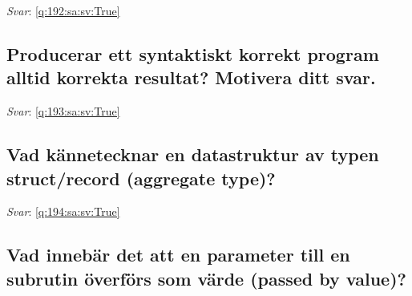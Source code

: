 \documentclass[a4paper,11pt,oneside]{article}
\begin{document}
\begin{sloppypar}
\label{q:192:sa:sv:False}

\vspace{2cm}

\noindent\makebox[\textwidth]{\hrulefill}

\vspace{1cm}

\textit{Svar}: \autoref{q:192:sa:sv:True}



\subsection{Producerar ett syntaktiskt korrekt program alltid korrekta resultat? Motivera ditt svar.}

\label{q:193:sa:sv:False}

\vspace{2cm}

\noindent\makebox[\textwidth]{\hrulefill}

\vspace{1cm}

\textit{Svar}: \autoref{q:193:sa:sv:True}



\subsection{Vad k\"annetecknar en datastruktur av typen struct/record (aggregate type)?}

\label{q:194:sa:sv:False}

\vspace{2cm}

\noindent\makebox[\textwidth]{\hrulefill}

\vspace{1cm}

\textit{Svar}: \autoref{q:194:sa:sv:True}



\subsection{Vad inneb\"ar det att en parameter till en subrutin \"overf\"ors som v\"arde (passed by value)?}

\label{q:195:sa:sv:False}

\vspace{2cm}

\noindent\makebox[\textwidth]{\hrulefill}

\vspace{1cm}


\end{sloppypar}
\end{document}
